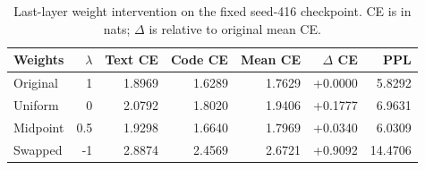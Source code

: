 \begin{table}[ht]
\centering
\small
\caption{Last-layer weight intervention on the fixed seed-416 checkpoint. CE is in nats; $\Delta$ is relative to original mean CE.}
\label{tab:gate-ablation}
\begin{tabular}{@{}lrrrrrr@{}}
\toprule
Weights & $\lambda$ & Text CE & Code CE & Mean CE & $\Delta$ CE & PPL \\
\midrule
Original & 1 & 1.8969 & 1.6289 & 1.7629 & +0.0000 & 5.8292 \\
Uniform & 0 & 2.0792 & 1.8020 & 1.9406 & +0.1777 & 6.9631 \\
Midpoint & 0.5 & 1.9298 & 1.6640 & 1.7969 & +0.0340 & 6.0309 \\
Swapped & -1 & 2.8874 & 2.4569 & 2.6721 & +0.9092 & 14.4706 \\
\bottomrule
\end{tabular}
\end{table}
